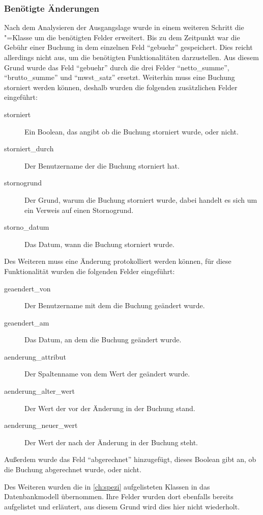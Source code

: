 \subsubsection{Benötigte Änderungen}
Nach dem Analysieren der Ausgangslage wurde in einem weiteren Schritt die "=Klasse um die benötigten Felder erweitert.
Bis zu dem Zeitpunkt war die Gebühr einer Buchung in dem einzelnen Feld "`gebuehr"' gespeichert.
Dies reicht allerdings nicht aus, um die benötigten Funktionalitäten darzustellen. Aus diesem Grund wurde das Feld  "`gebuehr"' durch die drei Felder "`netto\_summe"', "`brutto\_summe"' und "`mwst\_satz"' ersetzt.
Weiterhin muss eine Buchung storniert werden können, deshalb wurden die folgenden zusätzlichen Felder eingeführt:
\begin{description}
\item[storniert] Ein Boolean, das angibt ob die Buchung storniert wurde, oder nicht.
\item[storniert\_durch] Der Benutzername der die Buchung storniert hat.
\item[stornogrund] Der Grund, warum die Buchung storniert wurde, dabei handelt es sich um ein Verweis auf einen Stornogrund.
\item[storno\_datum] Das Datum, wann die Buchung storniert wurde.
\end{description}
Des Weiteren muss eine Änderung protokolliert werden können, für diese Funktionalität wurden die folgenden Felder eingeführt:
\begin{description}
\item[geaendert\_von] Der Benutzername mit dem die Buchung geändert wurde.
\item[geaendert\_am] Das Datum, an dem die Buchung geändert wurde.
\item[aenderung\_attribut] Der Spaltenname von dem Wert der geändert wurde.
\item[aenderung\_alter\_wert] Der Wert der vor der Änderung in der Buchung stand.
\item[aenderung\_neuer\_wert] Der Wert der nach der Änderung in der Buchung steht.
\end{description}
Außerdem wurde das Feld "`abgerechnet"' hinzugefügt, dieses Boolean gibt an, ob die Buchung abgerechnet wurde, oder nicht.

Des Weiteren wurden die in \autoref{ch:spezi} aufgelisteten Klassen in das Datenbankmodell übernommen. Ihre Felder wurden dort ebenfalls bereits aufgelistet und erläutert, aus diesem Grund wird dies hier nicht wiederholt.

